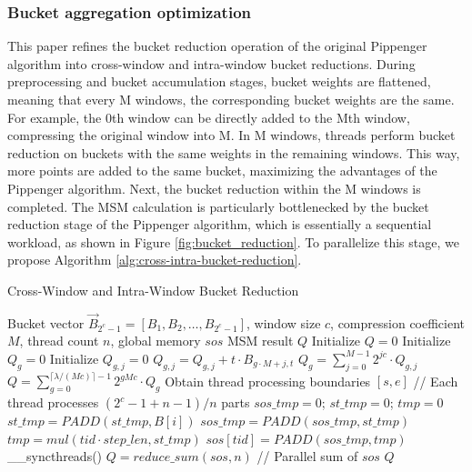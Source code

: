 \documentclass[journal=tches,final]{iacrtrans}
\begin{document}
\subsubsection{\textbf{Bucket aggregation optimization}}
This paper refines the bucket reduction operation of the original Pippenger algorithm into cross-window and intra-window bucket reductions. During preprocessing and bucket accumulation stages, bucket weights are flattened, meaning that every M windows, the corresponding bucket weights are the same. For example, the 0th window can be directly added to the Mth window, compressing the original window into M. In M windows, threads perform bucket reduction on buckets with the same weights in the remaining windows. This way, more points are added to the same bucket, maximizing the advantages of the Pippenger algorithm. Next, the bucket reduction within the M windows is completed. The MSM calculation is particularly bottlenecked by the bucket reduction stage of the Pippenger algorithm, which is essentially a sequential workload, as shown in Figure \ref{fig:bucket_reduction}. To parallelize this stage, we propose Algorithm \ref{alg:cross-intra-bucket-reduction}.

\begin{algorithm}
    \caption{Cross-Window and Intra-Window Bucket Reduction}
    \label{alg:cross-intra-bucket-reduction}
    \begin{algorithmic}[1]
    \REQUIRE Bucket vector $\vec{B}_{2^c - 1} = [B_1, B_2, \ldots, B_{2^c - 1}]$, window size $c$, compression coefficient $M$, thread count $n$, global memory $sos$
    \ENSURE MSM result $Q$
    \STATE Initialize $Q = 0$
        \STATE Initialize $Q_g = 0$
            \STATE Initialize $Q_{g,j} = 0$
                \STATE $Q_{g,j} = Q_{g,j} + t \cdot B_{g \cdot M + j, t}$
            \ENDFOR
        \ENDFOR
        \STATE $Q_g = \sum_{j=0}^{M-1} 2^{jc} \cdot Q_{g,j}$
    \ENDFOR
    \STATE $Q = \sum_{g=0}^{\lceil \lambda / (Mc) \rceil - 1} 2^{gMc} \cdot Q_g$
    \STATE Obtain thread processing boundaries $[s, e]$ \quad // Each thread processes $(2^c - 1 + n - 1) / n$ parts
    \STATE $sos\_tmp = 0$; $st\_tmp = 0$; $tmp = 0$
        \STATE $st\_tmp = PADD(st\_tmp, B[i])$
        \STATE $sos\_tmp = PADD(sos\_tmp, st\_tmp)$
        \STATE $tmp = mul(tid \cdot step\_len, st\_tmp)$
        \STATE $sos[tid] = PADD(sos\_tmp, tmp)$
    \ENDFOR
    \STATE \_\_syncthreads()
    \STATE $Q = reduce\_sum(sos, n)$ \quad // Parallel sum of $sos$
    \RETURN $Q$
    \end{algorithmic}
\end{algorithm}
\end{document}
